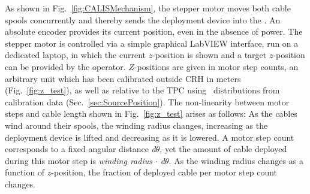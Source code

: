 As shown in Fig.~\ref{fig:CALISMechanism}, the stepper motor moves both cable spools concurrently and thereby sends the deployment device into the \lsv. An absolute encoder provides its current position, even in the absence of power. The stepper motor is controlled via a simple graphical LabVIEW interface, run on a dedicated laptop, in which the current $z$-position is shown and a target $z$-position can be provided by the operator. $Z$-positions are given in motor step counts, an arbitrary unit which has been calibrated outside CRH in meters (Fig.~\ref{fig:z_test}), as well as relative to the TPC using \tdrift\ distributions from calibration data (Sec.~\ref{sec:SourcePosition}). \label{sec:Nonlinearity:MotorStepCounts}
The non-linearity between motor steps and cable length shown in Fig.~\ref{fig:z_test} arises as follows: As the cables wind around their spools, the winding radius changes, increasing as the deployment device is lifted and decreasing as it is lowered. A motor step count corresponds to a fixed angular distance \textit{d$\theta$}, yet the amount of cable deployed during this motor step is \textit{winding radius $\cdot$ d$\theta$}. As the winding radius changes as a function of $z$-position, the fraction of deployed cable per motor step count changes.


